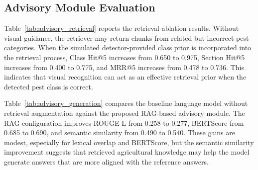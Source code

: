 ﻿\documentclass[11pt]{article}
\begin{document}
\subsection{Advisory Module Evaluation}

Table~\ref{tab:advisory_retrieval} reports the retrieval ablation results. Without visual guidance, the retriever may return chunks from related but incorrect pest categories. When the simulated detector-provided class prior is incorporated into the retrieval process, Class Hit@5 increases from 0.650 to 0.975, Section Hit@5 increases from 0.400 to 0.775, and MRR@5 increases from 0.478 to 0.736. This indicates that visual recognition can act as an effective retrieval prior when the detected pest class is correct.

\begin{table}[h]
\centering
\caption{Effect of visual pest recognition on retrieval performance.}
\label{tab:advisory_retrieval}
\scriptsize
{}
\end{table}

Table~\ref{tab:advisory_generation} compares the baseline language model without retrieval augmentation against the proposed RAG-based advisory module. The RAG configuration improves ROUGE-L from 0.258 to 0.277, BERTScore from 0.685 to 0.690, and semantic similarity from 0.490 to 0.540. These gains are modest, especially for lexical overlap and BERTScore, but the semantic similarity improvement suggests that retrieved agricultural knowledge may help the model generate answers that are more aligned with the reference answers.

\begin{table}[h]
\centering
\caption{Generation quality comparison between the No-RAG baseline and the retrieval-augmented advisory module.}
\label{tab:advisory_generation}
\scriptsize
{}
\end{table}
\end{document}
